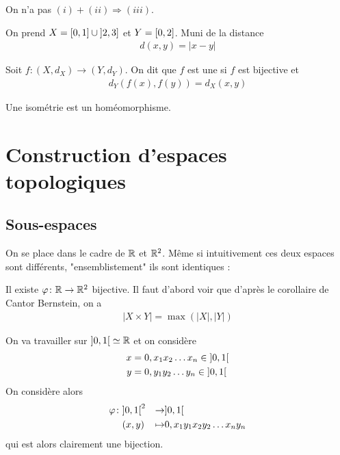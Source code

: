 \documentclass[french,a4paper,10pt]{article}
\begin{document}
		\begin{remark}
			On n'a pas $(i)+(ii)\Longrightarrow(iii)$.
				\begin{example}
					On prend $X=\mathopen{[}0, 1\mathclose{]}\cup \mathopen{]}2, 3\mathclose{]}$ et $Y=\mathopen{[}0, 2\mathclose{]}$. Muni de la distance
						\[\begin{aligned}
							d(x,y)=|x-y|
						\end{aligned}\]
				\end{example}
		\end{remark}
		\begin{definition}
			Soit $f\colon (X,d_X)\to (Y,d_Y)$. On dit que $f$ est une  si $f$ est bijective et
				\[\begin{aligned}
					d_Y(f(x), f(y))=d_X(x,y)
				\end{aligned}\]
		\end{definition}
		\begin{remark}
			Une isométrie est un homéomorphisme.		
		\end{remark}
	
	\section{Construction d'espaces topologiques}
		\subsection{Sous-espaces}
		On se place dans le cadre de $\mathbb{R}$ et $\mathbb{R}^2$. Même si intuitivement ces deux espaces sont différents, "ensemblistement" ils sont identiques :
		
		Il existe $\varphi \colon\mathbb{R}\to\mathbb{R}^2$ bijective. Il faut d'abord voir que d'après le corollaire de Cantor Bernstein, on a
			\[\begin{aligned}
				|X\times Y|=\max(|X|,|Y|)
			\end{aligned}\]
		
		On va travailler sur $\mathopen{]}0, 1\mathclose{[}\simeq \mathbb{R}$ et on considère
			\[\begin{aligned}
				x&=0,x_1x_2\dots x_n\in \mathopen{]}0, 1\mathclose{[}\\
				y&=0,y_1y_2\dots y_n\in\mathopen{]}0,1\mathclose{[}
			\end{aligned}\]
		On considère alors
			\[\begin{aligned}
				\varphi\colon &\mathopen{]}0, 1\mathclose{[}^2&\to &\mathopen{]}0, 1\mathclose{[}\\
				&(x,y)&\mapsto &0, x_1y_1x_2y_2\dots x_ny_n
			\end{aligned}\]
		qui est alors clairement une bijection.
		
\end{document}

